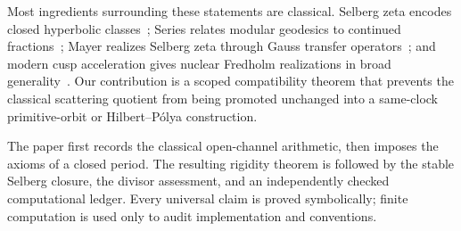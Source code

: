 Most ingredients surrounding these statements are classical.  Selberg zeta
encodes closed hyperbolic classes~\cite{Selberg1956}; Series relates modular
geodesics to continued fractions~\cite{Series1985}; Mayer realizes Selberg
zeta through Gauss transfer operators~\cite{Mayer1990,Mayer1991}; and modern
cusp acceleration gives nuclear Fredholm realizations in broad
generality~\cite{PohlWabnitz2026}.  Our contribution is a scoped compatibility
theorem that prevents the classical scattering quotient from being promoted
unchanged into a same-clock primitive-orbit or Hilbert--P\'olya construction.

The paper first records the classical open-channel arithmetic, then imposes
the axioms of a closed period.  The resulting rigidity theorem is followed by
the stable Selberg closure, the divisor assessment, and an independently
checked computational ledger.  Every universal claim is proved symbolically;
finite computation is used only to audit implementation and conventions.
